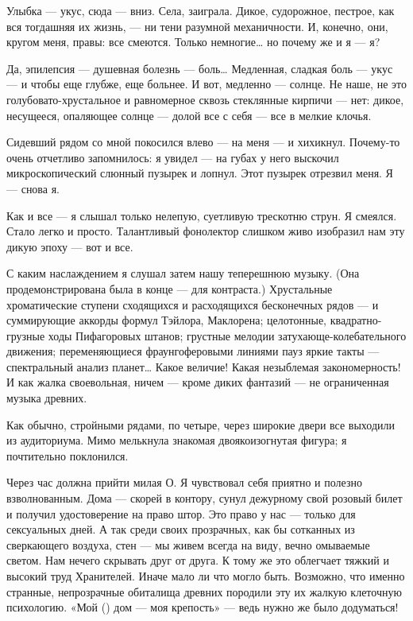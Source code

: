 \documentclass[11pt,openany]{book}
\begin{document}
Улыбка --- укус, сюда --- вниз. Села, заиграла. Дикое, судорожное, пестрое, как вся тогдашняя их жизнь, --- ни тени разумной механичности. И, конечно, они, кругом меня, правы: все смеются. Только немногие\ldots{} но почему же и я --- я?

Да, эпилепсия --- душевная болезнь --- боль\ldots{} Медленная, сладкая боль --- укус --- и чтобы еще глубже, еще больнее. И вот, медленно --- солнце. Не наше, не это голубовато-хрустальное и равномерное сквозь стеклянные кирпичи --- нет: дикое, несущееся, опаляющее солнце --- долой все с себя --- все в мелкие клочья.

Сидевший рядом со мной покосился влево --- на меня --- и хихикнул. Почему-то очень отчетливо запомнилось: я увидел --- на губах у него выскочил микроскопический слюнный пузырек и лопнул. Этот пузырек отрезвил меня. Я --- снова я.

Как и все --- я слышал только нелепую, суетливую трескотню струн. Я смеялся. Стало легко и просто. Талантливый фонолектор слишком живо изобразил нам эту дикую эпоху --- вот и все.

С каким наслаждением я слушал затем нашу теперешнюю музыку. (Она продемонстрирована была в конце --- для контраста.) Хрустальные хроматические ступени сходящихся и расходящихся бесконечных рядов --- и суммирующие аккорды формул Тэйлора, Маклорена; целотонные, квадратно-грузные ходы Пифагоровых штанов; грустные мелодии затухающе-колебательного движения; переменяющиеся фраунгоферовыми линиями пауз яркие такты --- спектральный анализ планет\ldots{} Какое величие! Какая незыблемая закономерность! И как жалка своевольная, ничем --- кроме диких фантазий --- не ограниченная музыка древних.

Как обычно, стройными рядами, по четыре, через широкие двери все выходили из аудиториума. Мимо мелькнула знакомая двоякоизогнутая фигура; я почтительно поклонился.

Через час должна прийти милая О. Я чувствовал себя приятно и полезно взволнованным. Дома --- скорей в контору, сунул дежурному свой розовый билет и получил удостоверение на право штор. Это право у нас --- только для сексуальных дней. А так среди своих прозрачных, как бы сотканных из сверкающего воздуха, стен --- мы живем всегда на виду, вечно омываемые светом. Нам нечего скрывать друг от друга. К тому же это облегчает тяжкий и высокий труд Хранителей. Иначе мало ли что могло быть. Возможно, что именно странные, непрозрачные обиталища древних породили эту их жалкую клеточную психологию. «Мой () дом --- моя крепость» --- ведь нужно же было додуматься!
\end{document}

